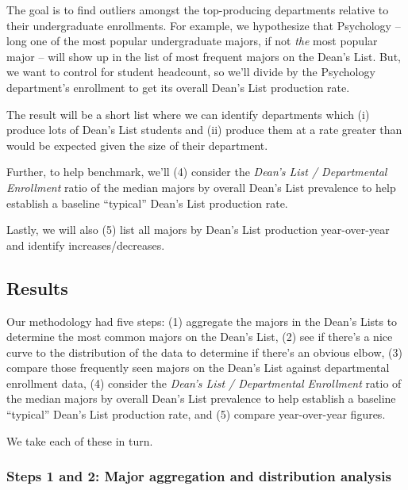 \documentclass[10]{article}
\begin{document}
The goal is to find outliers amongst the top-producing departments relative to their undergraduate enrollments. For example, we hypothesize that Psychology -- long one of the most popular undergraduate majors, if not \textit{the} most popular major -- will show up in the list of most frequent majors on the Dean's List. But, we want to control for student headcount, so we'll divide by the Psychology department's enrollment to get its overall Dean's List production rate.

The result will be a short list where we can identify departments which (i) produce lots of Dean's List students and (ii) produce them at a rate greater than would be expected given the size of their department.

Further, to help benchmark, we'll (4) consider the \textit{Dean's List / Departmental Enrollment} ratio of the median majors by overall Dean's List prevalence to help establish a baseline ``typical'' Dean's List production rate.

Lastly, we will also (5) list all majors by Dean's List production year-over-year and identify increases/decreases.

\subsection{Results}
Our methodology had five steps: (1) aggregate the majors in the Dean's Lists to determine the most common majors on the Dean's List, (2) see if there's a nice curve to the distribution of the data to determine if there's an obvious elbow, (3) compare those frequently seen majors on the Dean's List against departmental enrollment data, (4) consider the \textit{Dean's List / Departmental Enrollment} ratio of the median majors by overall Dean's List prevalence to help establish a baseline ``typical'' Dean's List production rate, and (5) compare year-over-year figures.

We take each of these in turn.

\subsubsection{Steps 1 and 2: Major aggregation and distribution analysis}

\qquad
\end{document}
